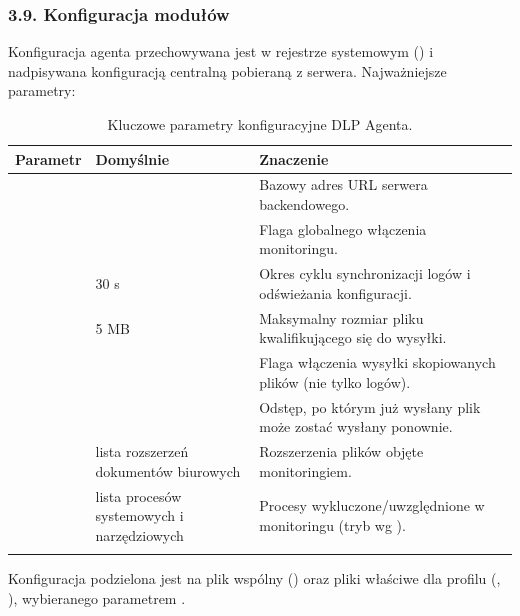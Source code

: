 \subsubsection*{3.9. Konfiguracja modułów}


Konfiguracja agenta przechowywana jest w rejestrze systemowym
() i nadpisywana
konfiguracją centralną pobieraną z serwera. Najważniejsze parametry:

\begingroup\footnotesize
\begin{longtable}{M{4cm} M{3cm} M{8cm}}
\toprule
{}
\textbf{Parametr} & \textbf{Domyślnie} & \textbf{Znaczenie} \\
\midrule
\endhead
{} &  & Bazowy adres URL serwera backendowego. \\
 &  & Flaga globalnego włączenia monitoringu. \\
 & 30 s & Okres cyklu synchronizacji logów i odświeżania konfiguracji. \\
 & 5 MB & Maksymalny rozmiar pliku kwalifikującego się do wysyłki. \\
 &  & Flaga włączenia wysyłki skopiowanych plików (nie tylko logów). \\
 &  & Odstęp, po którym już wysłany plik może zostać wysłany ponownie. \\
 & lista rozszerzeń dokumentów biurowych & Rozszerzenia plików objęte monitoringiem. \\
 & lista procesów systemowych i narzędziowych & Procesy wykluczone/uwzględnione w monitoringu (tryb wg ). \\
\bottomrule
\caption{Kluczowe parametry konfiguracyjne DLP Agenta.}
\end{longtable}
\endgroup


Konfiguracja podzielona jest na plik wspólny () oraz pliki właściwe dla
profilu (, ), wybieranego
parametrem .

